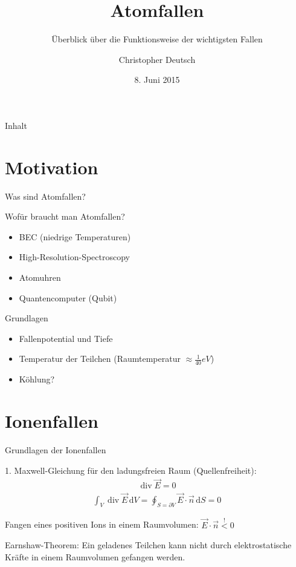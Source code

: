\documentclass[12pt]{beamer}
\author[Christopher Deutsch]
{Christopher Deutsch}
\title
{Atomfallen}
\subtitle
{Überblick über die Funktionsweise der wichtigsten Fallen}
\institute[]
{Rheinische Friedrich-Wilhelms-Universität Bonn \\
Proseminar Präsentationstechnik SS15}
\date{8. Juni 2015}
\DeclareMathOperator{\divergence}{div}
\begin{document}
\maketitle

\begin{frame}{Inhalt}
	\tableofcontents
\end{frame}


\section{Motivation}

\begin{frame}{Was sind Atomfallen?}
\end{frame}

\begin{frame}{Wofür braucht man Atomfallen?}
	\begin{itemize}
		\item BEC (niedrige Temperaturen)
		\item High-Resolution-Spectroscopy
		\item Atomuhren
		\item Quantencomputer (Qubit)
	\end{itemize}
\end{frame}

\begin{frame}{Grundlagen}
	\begin{itemize}
		\item Fallenpotential und Tiefe
		\item Temperatur der Teilchen (Raumtemperatur $\approx \frac{1}{40} \si{eV}$)
		\item Köhlung?
		
	\end{itemize}
\end{frame}


\section{Ionenfallen}

\begin{frame}{Grundlagen der Ionenfallen}
\end{frame}



\begin{frame}
	1. Maxwell-Gleichung für den ladungsfreien Raum (Quellenfreiheit):
	\begin{align}
	\divergence \vec{E} = 0
	\end{align}
	\begin{align}
	\int_{V} \divergence \vec{E} \, \mathrm{d}V = \oint_{S = \partial V} \vec{E} \cdot \vec{n} \, \mathrm{d}S = 0
	\end{align}
	
	Fangen eines positiven Ions in einem Raumvolumen: $\vec{E} \cdot \vec{n} \stackrel{!}{<} 0$
	
	\begin{block}{Earnshaw-Theorem:}
		Ein geladenes Teilchen kann nicht durch elektrostatische Kräfte in einem Raumvolumen gefangen werden.
	\end{block}
\end{frame}
\end{document}
